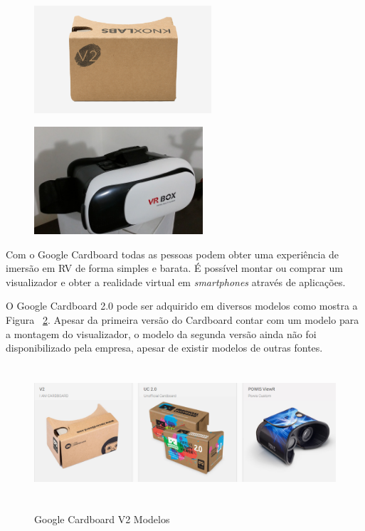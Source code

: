 \begin{figure}[H]
	
	\begin{minipage}{.5\textwidth}{
			\centering
			\includegraphics[height=4cm]{Imagens/googlecardboard.png}		
			\label{f.googlecardboard}	
		}
	\end{minipage}
	\begin{minipage}{.5\textwidth}{
			\centering
			\includegraphics[height=4cm]{Imagens/vrbox.jpg}		
			\label{f.vrbox}
		}
	\end{minipage}
	
\end{figure}

Com o Google Cardboard todas as pessoas podem obter uma experiência de imersão em RV de forma simples e barata. É possível montar ou comprar um visualizador e obter a realidade virtual em \textit{smartphones} através de aplicações. \cite{googlecardboard}

O Google Cardboard 2.0 pode ser adquirido em diversos modelos como mostra a Figura ~\ref{f.modelos}. Apesar da primeira versão do Cardboard contar com um modelo para a montagem do visualizador, o modelo da segunda versão ainda não foi disponibilizado pela empresa, apesar de existir modelos de outras fontes.

\begin{figure}[H]
	\caption{\small Google Cardboard V2 Modelos}
	\centering
	\includegraphics[height=5cm]{Imagens/modelos.png}
	\label{f.modelos}
\end{figure}

